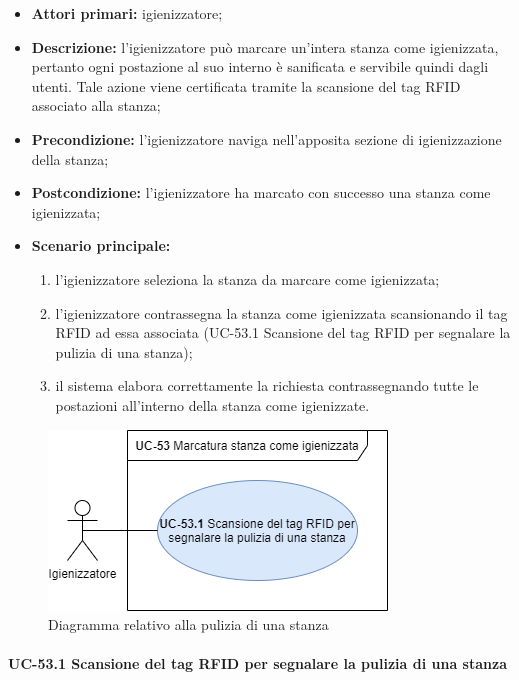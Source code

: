     \begin{itemize}
        \item \textbf{Attori primari:} igienizzatore;
        \item \textbf{Descrizione:} l’igienizzatore può marcare un'intera stanza come igienizzata, pertanto ogni postazione al suo interno è sanificata e servibile quindi dagli utenti. Tale azione viene certificata tramite la scansione del tag RFID associato alla stanza;
        \item \textbf{Precondizione:} l'igienizzatore naviga nell’apposita sezione di igienizzazione della stanza; 
        \item \textbf{Postcondizione:} l'igienizzatore ha marcato con successo una stanza come igienizzata;
        \item \textbf{Scenario principale:} 
            \begin{enumerate}
                \item l'igienizzatore seleziona la stanza da marcare come igienizzata;	
                \item l'igienizzatore contrassegna la stanza come igienizzata scansionando il tag RFID ad essa associata (UC-53.1 Scansione del tag RFID per segnalare la pulizia di una stanza);
                \item il sistema elabora correttamente la richiesta contrassegnando tutte le postazioni all'interno della stanza come igienizzate.
            \end{enumerate}
    \end{itemize}

\begin{figure}[H]
    \centering
        \includegraphics[scale=0.50]{src/CasiDUso/immagini/StanzaIgienizzata.png}
            \caption{Diagramma relativo alla pulizia di una stanza}
    \end{figure}
    

\paragraph{UC-53.1 Scansione del tag RFID per segnalare la pulizia di una stanza}


